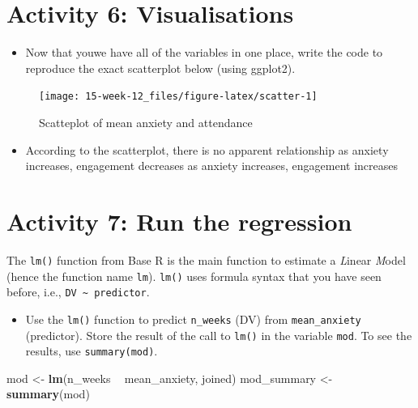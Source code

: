 \documentclass[]{book}
\newenvironment{Shaded}{\begin{snugshade}}{\end{snugshade}}
\newcommand{\KeywordTok}[1]{\textcolor[rgb]{0.13,0.29,0.53}{\textbf{#1}}}
\newcommand{\NormalTok}[1]{#1}
\newcommand{\OperatorTok}[1]{\textcolor[rgb]{0.81,0.36,0.00}{\textbf{#1}}}
\newcommand{\StringTok}[1]{\textcolor[rgb]{0.31,0.60,0.02}{#1}}
\providecommand{\tightlist}{%
  \setlength{\itemsep}{0pt}\setlength{\parskip}{0pt}}
\begin{document}
\hypertarget{activity-6-visualisations}{%
\section{Activity 6: Visualisations}\label{activity-6-visualisations}}

\begin{itemize}
\tightlist
\item
  Now that youwe have all of the variables in one place, write the code to reproduce the exact scatterplot below (using ggplot2).
\end{itemize}

\begin{figure}

{\centering \texttt{[image: 15-week-12\_files/figure-latex/scatter-1]} 

}

\caption{Scatteplot of mean anxiety and attendance}\label{fig:scatter}
\end{figure}

\begin{itemize}
\tightlist
\item
  According to the scatterplot, there is no apparent relationship as anxiety increases, engagement decreases as anxiety increases, engagement increases
\end{itemize}

\hypertarget{activity-7-run-the-regression}{%
\section{Activity 7: Run the regression}\label{activity-7-run-the-regression}}

The \texttt{lm()} function from Base R is the main function to estimate a \emph{L}inear \emph{M}odel (hence the function name \texttt{lm}). \texttt{lm()} uses formula syntax that you have seen before, i.e., \texttt{DV\ \textasciitilde{}\ predictor}.

\begin{itemize}
\tightlist
\item
  Use the \texttt{lm()} function to predict \texttt{n\_weeks} (DV) from \texttt{mean\_anxiety} (predictor). Store the result of the call to \texttt{lm()} in the variable \texttt{mod}. To see the results, use \texttt{summary(mod)}.
\end{itemize}

\begin{Shaded}
\begin{Highlighting}[]
\NormalTok{mod <-}\StringTok{ }\KeywordTok{lm}\NormalTok{(n_weeks }\OperatorTok{~}\StringTok{ }\NormalTok{mean_anxiety, joined)}
\NormalTok{mod_summary <-}\StringTok{ }\KeywordTok{summary}\NormalTok{(mod)}
\end{Highlighting}
\end{Shaded}
\end{document}
